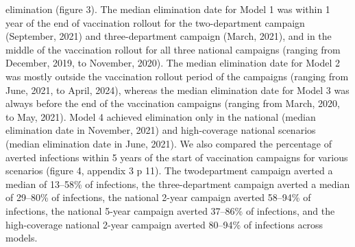 elimination (figure 3). The median elimination date for Model 1 was within 1 year of the end of vaccination rollout for the two-department campaign (September, 2021) and three-department campaign (March, 2021), and in the middle of the vaccination rollout for all three national campaigns (ranging from December, 2019, to November, 2020). The median elimination date for Model 2 was mostly outside the vaccination rollout period of the campaigns (ranging from June, 2021, to April, 2024), whereas the median elimination date for Model 3 was always before the end of the vaccination campaigns (ranging from March, 2020, to May, 2021). Model 4 achieved elimination only in the national (median elimination date in November, 2021) and high-coverage national scenarios (median elimination date in June, 2021). We also compared the percentage of averted infections within 5 years of the start of vaccination campaigns for various scenarios (figure 4, appendix 3 p 11). The twodepartment campaign averted a median of 13–58\% of infections, the three-department campaign averted a median of 29–80\% of infections, the national 2-year campaign averted 58–94\% of infections, the national 5-year campaign averted 37–86\% of infections, and the high-coverage national 2-year campaign averted 80–94\% of infections across models.
     
